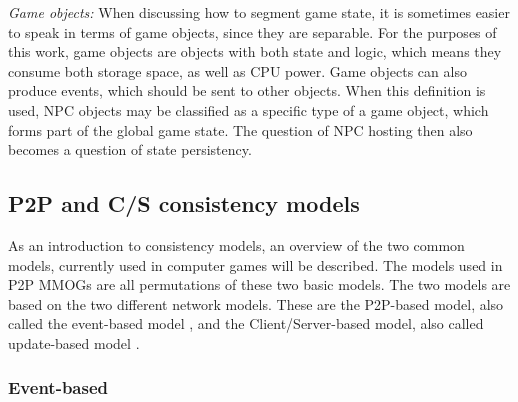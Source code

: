 \documentclass[10pt,a4paper,journal,cspaper,compsoc]{IEEEtran}
\begin{document}
\emph{Game objects:} When discussing how to segment game state, it is sometimes easier to speak in terms of game objects, since they are
    separable. For the purposes of this work, game objects are objects with both state and logic, which means they consume both storage
    space, as well as CPU power. Game objects can also produce events, which should be sent to other objects. When this definition is used,
    NPC objects may be classified as a specific type of a game object, which forms part of the global game state. The question of NPC hosting
    then also becomes a question of state persistency.



\subsection{P2P and C/S consistency models}
\label{p2p_cs_models}

As an introduction to consistency models, an overview of the two common models, currently used in computer games will be described. The models used
in P2P MMOGs are all permutations of these two basic models. The two models are based on the two different network models. These are the P2P-based
model, also called the event-based model \cite{p2p_cm_aoe}, and the Client/Server-based model, also called update-based model
\cite{unreal_networking}.

\subsubsection{Event-based}
\end{document}
